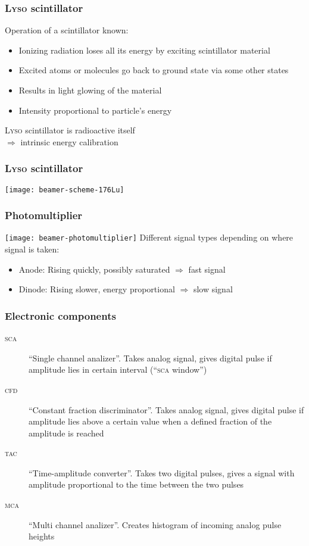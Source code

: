 \documentclass[english, fleqn]{beamer}
\begin{document}
\begin{frame}
    \frametitle{\textsc{Lyso} scintillator}
    Operation of a scintillator known:
    \pause
    \begin{itemize}
        \item 
            Ionizing radiation loses all its energy by exciting scintillator material
        \item
            Excited atoms or molecules go back to ground state via some other states
        \item
            Results in light glowing of the material
        \item
            Intensity proportional to particle's energy
    \end{itemize}
    \textsc{Lyso} scintillator is radioactive itself\\
    $\Rightarrow$ intrinsic energy calibration
\end{frame}

\begin{frame}
    \frametitle{\textsc{Lyso} scintillator}
    \centering
    \texttt{[image: beamer-scheme-176Lu]}
\end{frame}

\begin{frame}
    \frametitle{Photomultiplier}
    \texttt{[image: beamer-photomultiplier]}
    \pause
    Different signal types depending on where signal is taken:
    \begin{itemize}
        \item 
            Anode: Rising quickly, possibly saturated $\Rightarrow$ fast signal
        \item
            Dinode: Rising slower, energy proportional $\Rightarrow$ slow signal
    \end{itemize}
\end{frame}

\begin{frame}
    \frametitle{Electronic components}
    \begin{description}
    \item[\textsc{sca}]
        “Single channel analizer”. Takes analog signal, gives digital pulse if amplitude lies in certain interval (“\textsc{sca} window”)
    \item[\textsc{cfd}]
        “Constant fraction discriminator”. Takes analog signal, gives digital pulse if amplitude lies above a certain value when a defined fraction of the amplitude is reached
    \item[\textsc{tac}]
        “Time-amplitude converter”. Takes two digital pulses, gives a signal with amplitude proportional to the time between the two pulses
    \item[\textsc{mca}]
        “Multi channel analizer”. Creates histogram of incoming analog pulse heights
    \end{description}
\end{frame}
\end{document}
